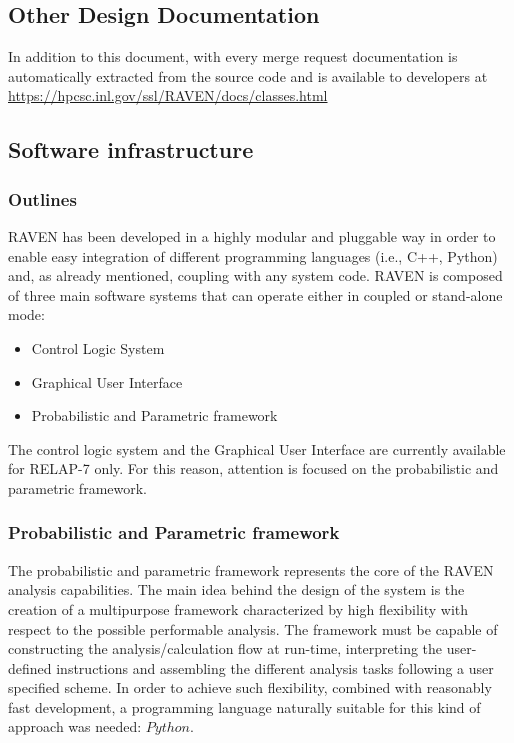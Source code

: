 \subsection{Other Design Documentation}

In addition to this document, with every merge request documentation
is automatically extracted from the source code and is available to
developers at \url{https://hpcsc.inl.gov/ssl/RAVEN/docs/classes.html}

\subsection{Software infrastructure}
\subsubsection{Outlines}
RAVEN has been developed in a highly modular and pluggable way in order to enable easy integration of different programming languages (i.e., C++, Python) and, as already mentioned, coupling with any system code.  
RAVEN is composed of three main software systems that can operate either in coupled or stand-alone mode:
\begin{itemize}
  \item Control Logic System
  \item Graphical User Interface
  \item Probabilistic and Parametric framework
\end{itemize}
The control logic system and the Graphical User Interface are currently available for RELAP-7 only. For this reason, attention is focused on the probabilistic and parametric framework.

\subsubsection{Probabilistic and Parametric framework}
The probabilistic and parametric framework represents the core of the RAVEN analysis capabilities. The main idea behind the design of the system is the creation of a multipurpose framework characterized by high flexibility with respect to the possible performable analysis. The framework must be capable of constructing the analysis/calculation flow at run-time, interpreting the user-defined instructions and assembling the different analysis tasks following a user specified scheme. 
In order to achieve such flexibility, combined with reasonably fast development, a programming language naturally suitable for this kind of approach was needed: $Python$.  


